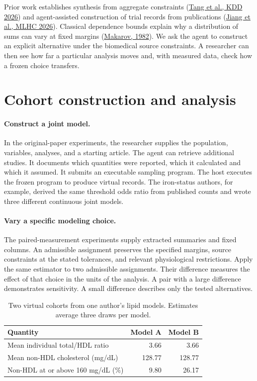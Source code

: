 \documentclass[sigconf,anonymous,nonacm]{acmart}
\begin{document}
Prior work establishes synthesis from aggregate constraints (\href{https://arxiv.org/html/2505.14752v4}{Tang et al., KDD 2026}) and agent-assisted construction of trial records from publications (\href{https://proceedings.mlr.press/v340/jiang26a.html}{Jiang et al., MLHC 2026}). Classical dependence bounds explain why a distribution of sums can vary at fixed margins (\href{https://doi.org/10.1137/1126086}{Makarov, 1982}). We ask the agent to construct an explicit alternative under the biomedical source constraints. A researcher can then see how far a particular analysis moves and, with measured data, check how a frozen choice transfers.

\section{Cohort construction and analysis}
\paragraph{Construct a joint model.}
In the original-paper experiments, the researcher supplies the population, variables, analyses, and a starting article. The agent can retrieve additional studies. It documents which quantities were reported, which it calculated and which it assumed. It submits an executable sampling program. The host executes the frozen program to produce virtual records. The iron-status authors, for example, derived the same threshold odds ratio from published counts and wrote three different continuous joint models.

\paragraph{Vary a specific modeling choice.}
The paired-measurement experiments supply extracted summaries and fixed columns. An admissible assignment preserves the specified margins, source constraints at the stated tolerances, and relevant physiological restrictions. Apply the same estimator to two admissible assignments. Their difference measures the effect of that choice in the units of the analysis. A pair with a large difference demonstrates sensitivity. A small difference describes only the tested alternatives.

\begin{table}[h]
\centering\small
\caption{Two virtual cohorts from one author's lipid models. Estimates average three draws per model.}
\label{tab:lipid}
\begin{tabular}{@{}lrr@{}}
\toprule
Quantity & Model A & Model B\\
\midrule
Mean individual total/HDL ratio & 3.66 & 3.66\\
Mean non-HDL cholesterol (mg/dL) & 128.77 & 128.77\\
Non-HDL at or above 160 mg/dL (\%) & 9.80 & 26.17\\
\bottomrule
\end{tabular}
\end{table}
\end{document}
